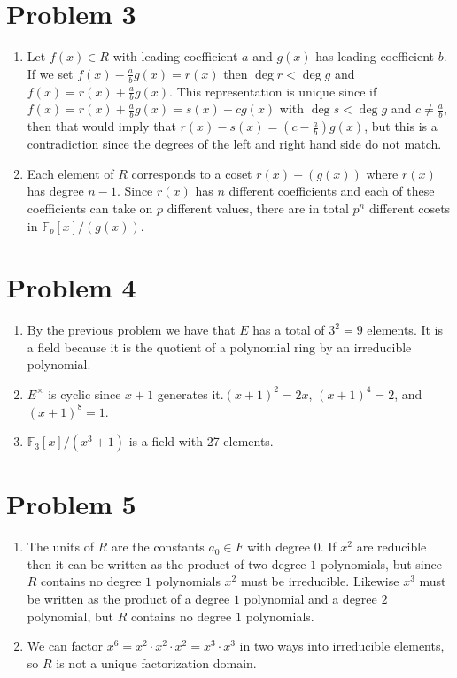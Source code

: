 \documentclass{article}
\begin{document}
\section*{Problem 3}
\begin{enumerate}
	\item Let $f(x) \in R$ with leading coefficient $a$ and $g(x)$ has leading coefficient $b$.
	If we set $f(x) - \frac{a}{b}g(x) = r(x)$ then $\deg r < \deg g$ and $f(x) = r(x) + \frac{a}{b}g(x)$.
	This representation is unique since if $f(x) = r(x) + \frac{a}{b}g(x) = s(x) + cg(x)$ with $\deg s < \deg g$ and $c \neq \frac{a}{b}$,
	then that would imply that $r(x) - s(x) = (c-\frac{a}{b})g(x)$, 
	but this is a contradiction since the degrees of the left and right hand side do not match.
	\item Each element of $R$ corresponds to a coset $r(x) + (g(x))$ where $r(x)$ has degree $n-1$.
	Since $r(x)$ has $n$ different coefficients and each of these coefficients can take on $p$ different values,
	there are in total $p^n$ different cosets in $\mathbb{F}_p[x]/(g(x))$.
\end{enumerate}
\newpage 

\section*{Problem 4}
\begin{enumerate}
	\item By the previous problem we have that $E$ has a total of $3^2 = 9$ elements. 
	It is a field because it is the quotient of a polynomial ring by an irreducible polynomial.
	\item $E^\times$ is cyclic since $x+1$ generates it.$(x+1)^2 = 2x$, $(x+1)^4 = 2$, and $(x+1)^8 = 1$.
	\item $\mathbb{F}_3[x]/(x^3+1)$ is a field with 27 elements.
\end{enumerate}
\newpage 

\section*{Problem 5}
\begin{enumerate}
	\item The units of $R$ are the constants $a_0 \in F$ with degree $0$.
	If $x^2$ are reducible then it can be written as the product of two degree $1$ polynomials,
	but since $R$ contains no degree $1$ polynomials $x^2$ must be irreducible.
	Likewise $x^3$ must be written as the product of a degree $1$ polynomial and 
	a degree $2$ polynomial, but $R$ contains no degree $1$ polynomials.
	\item We can factor $x^6 = x^2\cdot x^2\cdot x^2 = x^3\cdot x^3$ 
	in two ways into irreducible elements, so $R$ is not a unique factorization domain.
\end{enumerate}
\newpage 
\end{document}
